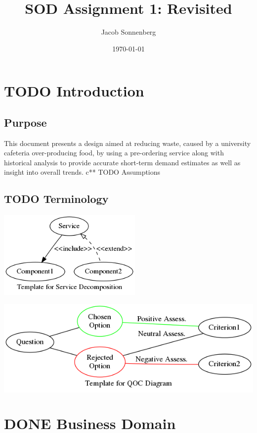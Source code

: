\documentclass[11pt]{article}
\author{Jacob Sonnenberg}
\date{\today}
\title{SOD Assignment 1: Revisited}
\begin{document}
\maketitle
\tableofcontents

\section{{\bfseries\sffamily TODO} Introduction}
\label{sec:orgb54efe6}
\subsection{Purpose}
\label{sec:orgc5bf4ab}
   This document presents a design aimed at reducing waste, caused by
   a university cafeteria over-producing food, by using a pre-ordering
   service along with historical analysis to provide accurate
   short-term demand estimates as well as insight into overall trends.
c** TODO Assumptions
\subsection{{\bfseries\sffamily TODO} Terminology}
\label{sec:org11e0de1}
\begin{center}
\includegraphics[width=7cm]{res/decomp_example.png}
\end{center}

\begin{center}
\includegraphics[width=.9\linewidth]{res/qoc_example.png}
\end{center}

\section{{\bfseries\sffamily DONE} Business Domain}
\label{sec:orgae54992}
\end{document}
